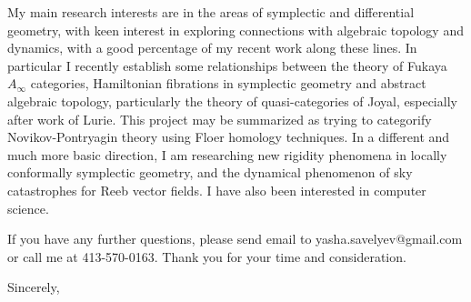 \documentclass[12pt]{letter}
\begin{document}
\begin{letter}{
}
%

My main research interests are in the areas of symplectic and differential geometry, 
with keen interest in exploring connections with algebraic topology and dynamics,  with a
good percentage of my recent work along these lines.  In particular I recently
establish some  relationships between the theory of Fukaya $A _{\infty} $
categories, Hamiltonian fibrations in symplectic geometry and abstract
algebraic topology, particularly the theory of quasi-categories of Joyal,
especially after work of Lurie. This project may be summarized as trying to categorify Novikov-Pontryagin theory using Floer homology techniques.
In a different and much more basic direction, I am researching new rigidity phenomena in locally conformally symplectic geometry, 
and the dynamical phenomenon of sky catastrophes for Reeb vector fields. I have also been interested in computer science.

 If
you have any further questions, please send email to 
{\sf yasha.savelyev@gmail.com} or call me at 413-570-0163. 
Thank you for your time and consideration.


\closing{Sincerely,} 


\end{letter}
\end{document}
